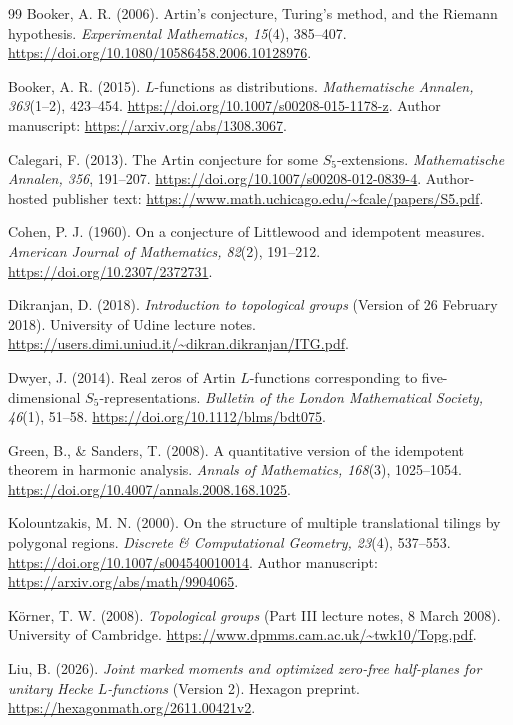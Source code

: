 \documentclass[11pt]{article}
\theoremstyle{definition}
\theoremstyle{remark}
\numberwithin{equation}{section}
\begin{document}
\begin{thebibliography}{99}
Booker, A. R. (2006). Artin's conjecture, Turing's method, and the Riemann hypothesis.
\emph{Experimental Mathematics, 15}(4), 385--407.
\url{https://doi.org/10.1080/10586458.2006.10128976}.

Booker, A. R. (2015). $L$-functions as distributions.
\emph{Mathematische Annalen, 363}(1--2), 423--454.
\url{https://doi.org/10.1007/s00208-015-1178-z}.
Author manuscript: \url{https://arxiv.org/abs/1308.3067}.

Calegari, F. (2013). The Artin conjecture for some $S_5$-extensions.
\emph{Mathematische Annalen, 356}, 191--207.
\url{https://doi.org/10.1007/s00208-012-0839-4}.
Author-hosted publisher text: \url{https://www.math.uchicago.edu/~fcale/papers/S5.pdf}.

Cohen, P. J. (1960). On a conjecture of Littlewood and idempotent measures.
\emph{American Journal of Mathematics, 82}(2), 191--212.
\url{https://doi.org/10.2307/2372731}.

Dikranjan, D. (2018). \emph{Introduction to topological groups} (Version of 26 February 2018). University of Udine lecture notes.
\url{https://users.dimi.uniud.it/~dikran.dikranjan/ITG.pdf}.

Dwyer, J. (2014). Real zeros of Artin $L$-functions corresponding to five-dimensional $S_5$-representations.
\emph{Bulletin of the London Mathematical Society, 46}(1), 51--58.
\url{https://doi.org/10.1112/blms/bdt075}.

Green, B., \& Sanders, T. (2008). A quantitative version of the idempotent theorem in harmonic analysis.
\emph{Annals of Mathematics, 168}(3), 1025--1054.
\url{https://doi.org/10.4007/annals.2008.168.1025}.

Kolountzakis, M. N. (2000). On the structure of multiple translational tilings by polygonal regions.
\emph{Discrete \& Computational Geometry, 23}(4), 537--553.
\url{https://doi.org/10.1007/s004540010014}.
Author manuscript: \url{https://arxiv.org/abs/math/9904065}.

K{\"o}rner, T. W. (2008). \emph{Topological groups} (Part III lecture notes, 8 March 2008). University of Cambridge.
\url{https://www.dpmms.cam.ac.uk/~twk10/Topg.pdf}.

Liu, B. (2026). \emph{Joint marked moments and optimized zero-free half-planes for unitary Hecke $L$-functions} (Version 2). Hexagon preprint.
\url{https://hexagonmath.org/2611.00421v2}.


\end{thebibliography}
\end{document}
